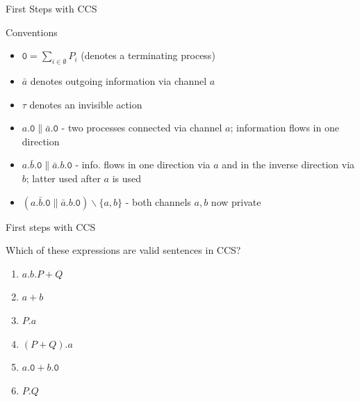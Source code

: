 \documentclass{beamer}
\begin{document}
\begin{frame}{First Steps with CCS}
        \begin{block}{Conventions}
                 \begin{itemize}
                  \item $\mathtt{0} = \sum_{i \in \emptyset} P_i$ 
                          (denotes a terminating process)
                  \item $\bar{a}$ denotes outgoing information via channel $a$ 
                  \item $\tau$ denotes an invisible action
                  \end{itemize}
        \end{block}
  
        \begin{examples}
          \begin{itemize}
                \item $a . \mathtt{0} \parallel \bar{a} . \mathtt{0}$ - two processes
                        connected via channel $a$; information flows in one direction
                \item $a . \bar{b} . \mathtt{0} \parallel \bar{a} . b . \mathtt{0}$ -
                        info. flows in one direction via $a$ and in the inverse
                        direction via $b$; latter used after $a$ is used 
                \item $(a . \bar{b} . \mathtt{0} \parallel \bar{a} . b . \mathtt{0})
                  \backslash \{a,b\}$ - both channels $a,b$ now private
          \end{itemize}
        \end{examples}
\end{frame}

\begin{frame}{First steps with CCS}

  Which of these expressions are valid sentences in CCS?

  \begin{enumerate}
  \item $a . b . P + Q$
  \item $a + b$
  \item $P . a$
  \item $(P + Q). a$
  \item $a . \mathtt{0} + b . \mathtt{0}$
  \item $P . Q$
  \end{enumerate}
\end{frame}
\end{document}
